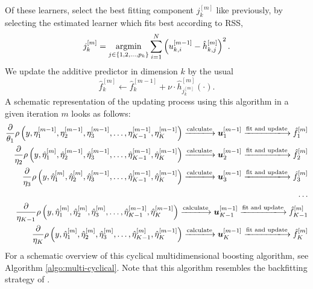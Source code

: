 Of these learners, select the best fitting component $j_k^{[m]}$ like previously, by selecting the estimated learner which fits best according to RSS,
\begin{equation*}
    j_k^{[m]}=\operatorname*{argmin}_{j\in\{1,2,\ldots,p_k\}}\sum_{i=1}^N \left(u_{k,i}^{[m-1]}-\hat{h}_{k,j}^{[m]}\right)^2.
\end{equation*}
We update the additive predictor in dimension $k$ by the usual
\begin{equation*}
    \hat{f}_k^{[m]}\gets\hat{f}_k^{[m-1]}+\nu\cdot \hat{h}^{[m]}_{j_k^{[m]}}(\cdot).
\end{equation*}
A schematic representation of the updating process using this algorithm in a given iteration $m$ looks as follows:
\begin{align*}
    \frac{\partial}{\theta_1}\rho\left(y,\eta_1^{[m-1]},\eta_2^{[m-1]},\eta_3^{[m-1]},\ldots,\eta_{K-1}^{[m-1]},\eta_K^{[m-1]}\right)
    \xlongrightarrow{\text{calculate}}\u_{1}^{[m-1]}
    \xlongrightarrow{\text{fit and update}}\hat{f}_{1}^{[m]} \\
    \frac{\partial}{\eta_2}\rho\left(y,\hat{\eta}_1^{[m]},\hat{\eta}_2^{[m-1]},\hat{\eta}_3^{[m-1]},\ldots,\hat{\eta}_{K-1}^{[m-1]},\hat{\eta}_K^{[m-1]}\right)
    \xlongrightarrow{\text{calculate}} \u_{2}^{[m-1]}
    \xlongrightarrow{\text{fit and update}}\hat{f}_{2}^{[m]} \\
    \frac{\partial}{\eta_3}\rho\left(y,\hat{\eta}_1^{[m]},\hat{\eta}_2^{[m]},\hat{\eta}_3^{[m-1]},\ldots,\hat{\eta}_{K-1}^{[m-1]},\hat{\eta}_K^{[m-1]}\right)
    \xlongrightarrow{\text{calculate}}\u_{3}^{[m-1]}
    \xlongrightarrow{\text{fit and update}}\hat{f}_{3}^{[m]} \\
    \ldots\\
    \frac{\partial}{\eta_{K-1}}\rho\left(y,\hat{\eta}_1^{[m]},\hat{\eta}_2^{[m]},\hat{\eta}_3^{[m]},\ldots,\hat{\eta}_{K-1}^{[m-1]},\hat{\eta}_K^{[m-1]}\right)
    \xlongrightarrow{\text{calculate}}\u_{K-1}^{[m-1]}
    \xlongrightarrow{\text{fit and update}}\hat{f}_{K-1}^{[m]} \\
    \frac{\partial}{\eta_K}\rho\left(y,\hat{\eta}_1^{[m]},\hat{\eta}_2^{[m]},\hat{\eta}_3^{[m]},\ldots,\hat{\eta}_{K-1}^{[m]},\hat{\eta}_K^{[m-1]}\right)
    \xlongrightarrow{\text{calculate}}\u_{K}^{[m-1]}
    \xlongrightarrow{\text{fit and update}}\hat{f}_{K}^{[m]}
\end{align*}
For a schematic overview of this cyclical multidimensional boosting algorithm, see Algorithm \ref{algo:multi-cyclical}.
Note that this algorithm resembles the backfitting strategy of \citet{hastie1986}.

